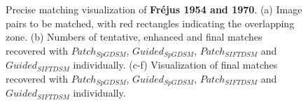 \begin{figure}[htbp]
\begin{center}
{\begin{minipage}[t]{0.48\linewidth}
			\end{minipage}%
		}
		\caption{Precise matching visualization of \textbf{Fr{\'e}jus 1954 and 1970}. (a) Image pairs to be matched, with red rectangles indicating the overlapping zone. (b) Numbers of tentative, enhanced and final matches recovered with $Patch_{SpGDSM}$, $Guided_{SpGDSM}$, $Patch_{SIFTDSM}$ and $Guided_{SIFTDSM}$ individually. (c-f) Visualization of final matches recovered with $Patch_{SpGDSM}$, $Guided_{SpGDSM}$, $Patch_{SIFTDSM}$ and $Guided_{SIFTDSM}$ individually.}
		\label{MatchVizFrejus1954-1970}
	\end{center}
\end{figure} 



